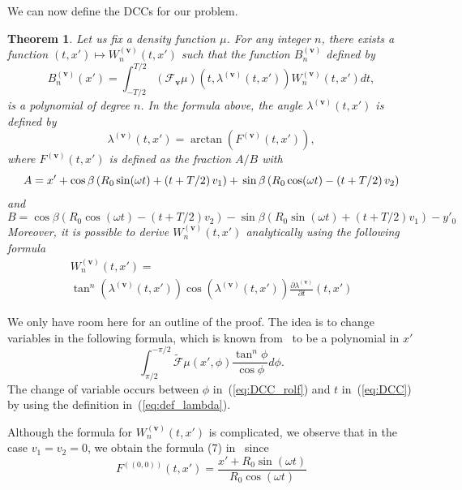 \documentclass[twocolumn]{IEEEtran}
\newcommand{\bv}{\mathbf{v}}
\newcommand{\Tbv}{\mathcal{F}_{\mathbf{v}}}
\newcommand{\Bnv}{B_n^{(\bv)}}
\newcommand{\Wnv}{W_n^{(\bv)}}
\newtheorem{theorem}{Theorem}
\begin{document}
We can now define the DCCs for our problem.
\begin{theorem}
\label{theo:main}
Let us fix a density function $\mu$. For any integer $n$, there exists a function $(t,x')\mapsto \Wnv(t,x')$ such that the function $\Bnv$ defined by
\begin{equation}
	\Bnv(x') = \int_{-T/2}^{T/2} \left( \Tbv \mu \right)\left( t,\lambda^{(\bv)}(t,x') \right) \Wnv(t,x') dt,
\label{eq:DCC}
\end{equation}
is a polynomial of degree $n$. In the formula above, the angle $\lambda^{(\bv)}(t,x')$ is defined by
\begin{equation}
	\lambda^{(\bv)}(t,x') = \arctan \left( F^{(\bv)}(t,x') \right),
\label{eq:def_lambda}
\end{equation}
where $F^{(\bv)}(t,x')$ is defined as the fraction $A/B$ with
\begin{dmath}
	A = x' + \cos \beta \left( R_0 \sin(\omega t) + \left( t + T/2 \right)v_1 \right) + \\
	\sin \beta \left( R_0 \cos(\omega t) - \left( t + T/2 \right)v_2 \right)
\end{dmath}
and
\begin{dmath}
	B = \cos \beta \left( R_0 \cos(\omega t) - \left( t + T/2 \right)v_2 \right) - \sin \beta \left( R_0 \sin(\omega t) + \left( t + T/2 \right)v_1 \right) - y'_0 
\end{dmath}
Moreover, it is possible to derive $\Wnv(t,x')$ analytically using the following formula
\begin{multline}
	\Wnv(t,x') = \\
	\tan^n \left( \lambda^{(\bv)}(t,x') \right) \cos \left( \lambda^{(\bv)}(t,x') \right) \frac{\partial \lambda^{(\bv)}}{\partial t} (t,x')
\end{multline}
\end{theorem}

We only have room here for an outline of the proof. The idea is to change variables in the following formula, which is known from~\cite{clackdoyle2013necessary} to be a polynomial in $x'$
\begin{equation}
	\int_{\pi/2}^{-\pi/2} \tilde{\mathcal{F}}\mu (x',\phi) \frac{\tan^n \phi}{\cos \phi} d\phi.
\label{eq:DCC_rolf}
\end{equation}
The change of variable occurs between $\phi$ in~(\ref{eq:DCC_rolf}) and $t$ in~(\ref{eq:DCC}) by using the definition in~(\ref{eq:def_lambda}).

Although the formula for $\Wnv(t,x')$ is complicated, we observe that in the case $v_1=v_2=0$, we obtain the formula (7) in~\cite{clackdoyle2015consistency} since
\begin{equation}
	F^{\left( (0,0)\right) }(t,x')= \frac{x' + R_0 \sin(\omega t)}{R_0 \cos(\omega t)}
\end{equation}
\end{document}
